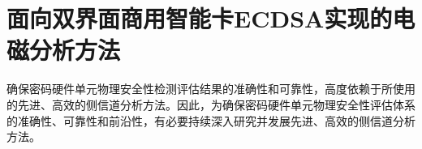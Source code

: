 \chapter{面向双界面商用智能卡ECDSA实现的电磁分析方法}\label{chap:search2}{
	确保密码硬件单元物理安全性检测评估结果的准确性和可靠性，高度依赖于所使用的先进、高效的侧信道分析方法。因此，为确保密码硬件单元物理安全性评估体系的准确性、可靠性和前沿性，有必要持续深入研究并发展先进、高效的侧信道分析方法。%
	
	
	
}
